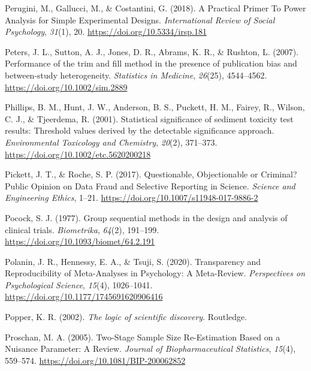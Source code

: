 \documentclass[
  letterpaper,
  DIV=11,
  numbers=noendperiod]{scrreprt}
\newlength{\cslhangindent}
\newlength{\cslentryspacingunit} %
\newenvironment{CSLReferences}[2] %
 {%
  \setlength{\parindent}{0pt}
  \ifodd #1
  \let\oldpar\par
  \def\par{\hangindent=\cslhangindent\oldpar}
  \fi
  \setlength{\parskip}{#2\cslentryspacingunit}
 }%
 {}
\begin{document}
\begin{CSLReferences}{1}{0}
\leavevmode{}%
Perugini, M., Gallucci, M., \& Costantini, G. (2018). A {Practical
Primer To Power Analysis} for {Simple Experimental Designs}.
\emph{International Review of Social Psychology}, \emph{31}(1), 20.
\url{https://doi.org/10.5334/irsp.181}

\leavevmode{}%
Peters, J. L., Sutton, A. J., Jones, D. R., Abrams, K. R., \& Rushton,
L. (2007). Performance of the trim and fill method in the presence of
publication bias and between-study heterogeneity. \emph{Statistics in
Medicine}, \emph{26}(25), 4544--4562.
\url{https://doi.org/10.1002/sim.2889}

\leavevmode{}%
Phillips, B. M., Hunt, J. W., Anderson, B. S., Puckett, H. M., Fairey,
R., Wilson, C. J., \& Tjeerdema, R. (2001). Statistical significance of
sediment toxicity test results: {Threshold} values derived by the
detectable significance approach. \emph{Environmental Toxicology and
Chemistry}, \emph{20}(2), 371--373.
\url{https://doi.org/10.1002/etc.5620200218}

\leavevmode{}%
Pickett, J. T., \& Roche, S. P. (2017). Questionable, {Objectionable} or
{Criminal}? {Public Opinion} on {Data Fraud} and {Selective Reporting}
in {Science}. \emph{Science and Engineering Ethics}, 1--21.
\url{https://doi.org/10.1007/s11948-017-9886-2}

\leavevmode{}%
Pocock, S. J. (1977). Group sequential methods in the design and
analysis of clinical trials. \emph{Biometrika}, \emph{64}(2), 191--199.
\url{https://doi.org/10.1093/biomet/64.2.191}

\leavevmode{}%
Polanin, J. R., Hennessy, E. A., \& Tsuji, S. (2020). Transparency and
{Reproducibility} of {Meta-Analyses} in {Psychology}: {A Meta-Review}.
\emph{Perspectives on Psychological Science}, \emph{15}(4), 1026--1041.
\url{https://doi.org/10.1177/1745691620906416}

\leavevmode{}%
Popper, K. R. (2002). \emph{{The logic of scientific discovery}}.
{Routledge}.

\leavevmode{}%
Proschan, M. A. (2005). Two-{Stage Sample Size Re-Estimation Based} on a
{Nuisance Parameter}: {A Review}. \emph{Journal of Biopharmaceutical
Statistics}, \emph{15}(4), 559--574.
\url{https://doi.org/10.1081/BIP-200062852}


\end{CSLReferences}
\end{document}
